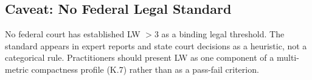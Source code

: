 \subsection{Caveat: No Federal Legal Standard}

No federal court has established LW $> 3$ as a binding legal threshold.
The standard appears in expert reports and state court decisions as a
heuristic, not a categorical rule.
Practitioners should present LW as one component of a multi-metric compactness
profile (K.7) rather than as a pass-fail criterion.
